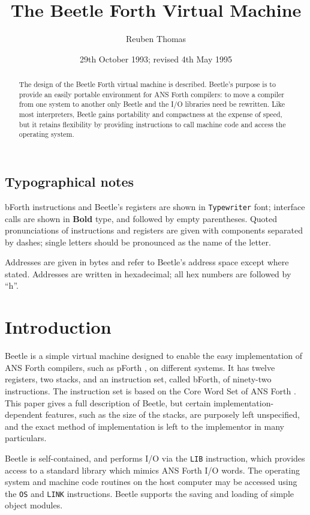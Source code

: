 \documentclass{article}
\title{The Beetle Forth Virtual Machine}
\author{Reuben Thomas}
\date{29th October 1993; revised 4th May 1995}
\newlength{\pronunc}\pronunc=1.7in
\begin{document}
\maketitle

\begin{abstract}
\noindent The design of the Beetle Forth virtual machine is described.
Beetle's purpose is to provide an easily portable environment for ANS Forth
compilers: to move a compiler from one system to another only Beetle and the I/O
libraries need be rewritten. Like most interpreters, Beetle gains portability
and compactness at the expense of speed, but it retains flexibility by providing
instructions to call machine code and access the operating system.
\end{abstract}


\subsection*{Typographical notes}

bForth instructions and Beetle's registers are shown in {\tt Typewriter} font;
interface calls are shown in {\bf Bold} type, and followed by empty parentheses.
Quoted pronunciations of instructions and registers are given with components
separated by dashes; single letters should be pronounced as the name of the
letter.

Addresses are given in bytes and refer to Beetle's address space except where
stated. Addresses are written in hexadecimal; all hex numbers are followed by
``h''.


\section{Introduction}

Beetle is a simple virtual machine designed to enable the easy implementation
of ANS Forth compilers, such as pForth \cite{beetledis}, on different systems.
It has twelve registers, two stacks, and an instruction set, called bForth, of
ninety-two instructions. The instruction set is based on the Core Word Set of
ANS Forth \cite{ANSIforth}. This paper gives a full description of Beetle, but
certain implementation-dependent features, such as the size of the stacks, are
purposely left unspecified, and the exact method of implementation is left to
the implementor in many particulars.

Beetle is self-contained, and performs I/O via the {\tt LIB} instruction, which
provides access to a standard library which mimics ANS Forth I/O words. The
operating system and machine code routines on the host computer may be accessed
using the {\tt OS} and {\tt LINK} instructions. Beetle supports the saving and
loading of simple object modules.
\end{document}
